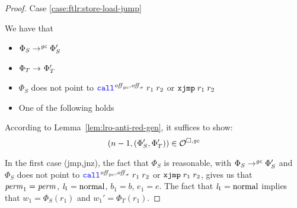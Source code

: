 \begin{proof}
  Case \ref{case:ftlr:store-load-jump}

  We have that
  \begin{itemize}
  \item $\Phi_S \step[\gc] \Phi_S'$
  \item $\Phi_T \step \Phi_T'$
  \item $\Phi_S$ does not point to $\scall{\offpc,\offsigma}{r_1}{r_2}$ or $\txjmp{r_1}{r_2}$
  \item One of the following holds
  \end{itemize}

  According to Lemma~\ref{lem:lro-anti-red-gen}, it suffices to show:
  \[
    \npair[n-1]{(\Phi_S',\Phi_T')} \in \lro
  \]

  In the first case (jmp,jnz), the fact that $\Phi_S$ is reasonable, with $\Phi_S \step[\gc] \Phi_S'$ and $\Phi_S$ does not point to $\scall{\offpc,\offsigma}{r_1}{r_2}$ or $\txjmp{r_1}{r_2}$, gives us that $\perm_1 = \perm$, $\lin_1 = \normal$, $b_1 = b$, $e_1 = e$.
  The fact that $\lin_1 =\normal$ implies that $w_1 =\Phi_S(r_1)$ and $w_1' = \Phi_T(r_1)$.


\end{proof}
